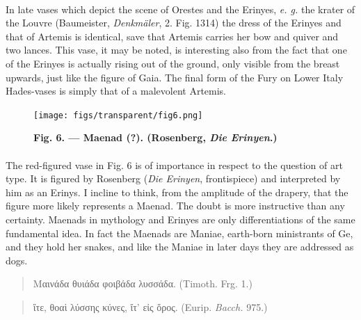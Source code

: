 \documentclass[a4paper, 11pt, oneside, polutonikogreek, english]{article}
\begin{document}
\paragraph{}
In late vases which depict the scene of Orestes and the Erinyes, \emph{e. g.} the krater of the Louvre (Baumeister, \emph{Denkmäler}, 2. Fig. 1314) the dress of the Erinyes and that of Artemis is identical, save that Artemis carries her bow and quiver and two lances. This vase, it may be noted, is interesting also from the fact that one of the Erinyes is actually rising out of the ground, only visible from the breast upwards, just like the figure of Gaia. The final form of the Fury on Lower Italy Hades-vases is simply that of a malevolent Artemis.
\begin{figure}[H]
\centering
\texttt{[image: figs/transparent/fig6.png]}
\caption{\bfseries Fig. 6. --- Maenad (?). (Rosenberg, \emph{Die Erinyen}.)}
\end{figure}
\paragraph{}
The red-figured vase in Fig. 6 is of importance in respect to the question of art type. It is figured by Rosenberg (\emph{Die Erinyen}, frontispiece) and interpreted by him as an Erinys. I incline to think, from the amplitude of the drapery, that the figure more likely represents a Maenad. The doubt is more instructive than any certainty. Maenads in mythology and Erinyes are only differentiations of the same fundamental idea. In fact the Maenads are Maniae, earth-born ministrants of Ge, and they hold her snakes, and like the Maniae in later days they are addressed as dogs.
\begin{quotation}
\large
Μαινάδα θυιάδα φοιβάδα λυσσάδα. (Timoth. Frg. 1.)
\end{quotation}
\begin{quotation}
\large
ἴτε, θοαὶ λύσσης κύνες, ἴτ' εἰς ὄρος. (Eurip. \emph{Bacch.} 975.)
\end{quotation}
\end{document}
